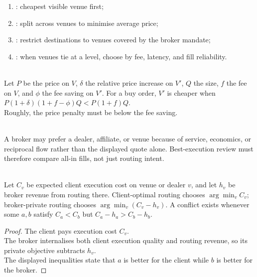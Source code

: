 \documentclass[a4paper,oneside,openany]{book}
\begin{document}
\begin{mechanism} 
\begin{enumerate}[label=\roman*.]
\setlength{\itemsep}{0pt}
\item {}: cheapest visible venue first;
\item {}: split across venues to minimise average price;
\item {}: restrict destinations to venues covered by the broker mandate;
\item {}: when venues tie at a level, choose by fee, latency, and fill reliability.
\end{enumerate}
\end{mechanism}

\begin{caveat} \\
Let $P$ be the price on $V$, $\delta$ the relative price increase on $V'$, $Q$ the size, $f$ the fee on $V$, and $\phi$ the fee saving on $V'$. For a buy order, $V'$ is cheaper when $P(1+\delta)(1+f-\phi)Q < P(1+f)Q$.\\
Roughly, the price penalty must be below the fee saving.
\end{caveat}

\begin{caveat} \\
A broker may prefer a dealer, affiliate, or venue because of service, economics, or reciprocal flow rather than the displayed quote alone. Best-execution review must therefore compare all-in fills, not just routing intent.
\end{caveat}

\begin{proposition} \\
Let $C_v$ be expected client execution cost on venue or dealer $v$, and let $h_v$ be broker revenue from routing there. Client-optimal routing chooses $\arg\min_v C_v$; broker-private routing chooses $\arg\min_v(C_v-h_v)$. A conflict exists whenever some $a,b$ satisfy $C_a<C_b$ but $C_a-h_a>C_b-h_b$.
\begin{proof}
The client pays execution cost $C_v$.\\
The broker internalises both client execution quality and routing revenue, so its private objective subtracts $h_v$.\\
The displayed inequalities state that $a$ is better for the client while $b$ is better for the broker.
\end{proof}
\end{proposition}
\end{document}
